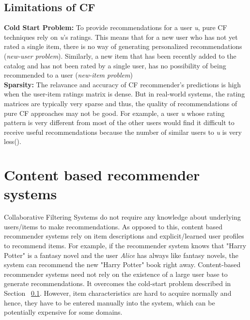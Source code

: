 \subsection{Limitations of CF}
\label{sec:limCF}
\textbf{Cold Start Problem:} To provide recommendations for a user \textit{u}, pure CF techniques rely on \textit{u}'s ratings. This means that for a new user who has not yet rated a single item, there is no way of generating personalized recommendations (\textit{new-user problem}). 
Similarly, a new item that has been recently added to the catalog and has not been rated by a single user, has no possibility of being recommended to a user (\textit{new-item problem})\\
\textbf{Sparsity:} The relavance and accuracy of CF recommender's predictions is high when the user-item ratings matrix is dense.
But in real-world systems, the rating matrices are typically very sparse and thus, the quality of recommendations of pure CF approaches may not be good.
For example, a user \textit{u} whose rating pattern is very different from most of the other users would find it difficult to receive useful recommendations because the number of similar users to \textit{u} is very less(\cite{balab1997}).




%

%

\section{Content based recommender systems}
\label{sec:content}
Collaborative Filtering Systems do not require any knowledge about underlying users/items to make recommendations.
As opposed to this, content based recommender systems rely on item descriptions and explicit/learned user profiles to recommend items.
For example, if the recommender system knows that "Harry Potter" is a fantasy novel and the user \textit{Alice} has always like fantasy novels, the system can recommend the new "Harry Potter" book right away. 
Content-based recommender systems need not rely on the existence of a large user base to generate recommendations.
It overcomes the cold-start problem described in Section ~\ref{sec:limCF}. However, item characteristics are hard to acquire normally and hence, they have to be entered manually into the system, which can be potentially expensive for some domains.

